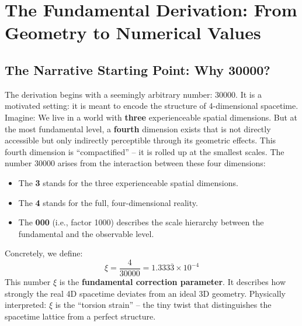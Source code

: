 	\section{The Fundamental Derivation: From Geometry to Numerical Values}
	\subsection{The Narrative Starting Point: Why 30000?}
	The derivation begins with a seemingly arbitrary number: \(30000\). It is a motivated setting: it is meant to encode the structure of 4-dimensional spacetime.
	Imagine: We live in a world with \textbf{three} experienceable spatial dimensions. But at the most fundamental level, a \textbf{fourth} dimension exists that is not directly accessible but only indirectly perceptible through its geometric effects. This fourth dimension is \enquote{compactified} -- it is rolled up at the smallest scales.
	The number \(30000\) arises from the interaction between these four dimensions:
	\begin{itemize}
		\item The \textbf{3} stands for the three experienceable spatial dimensions.
		\item The \textbf{4} stands for the full, four-dimensional reality.
		\item The \textbf{000} (i.e., factor 1000) describes the scale hierarchy between the fundamental and the observable level.
	\end{itemize}
	Concretely, we define:
	\begin{equation}
		\boxed{\xi = \frac{4}{30000} = 1.333\overline{3} \times 10^{-4}}
	\end{equation}
	This number \(\xi\) is the \textbf{fundamental correction parameter}. It describes how strongly the real 4D spacetime deviates from an ideal 3D geometry. Physically interpreted: \(\xi\) is the \enquote{torsion strain} -- the tiny twist that distinguishes the spacetime lattice from a perfect structure.
